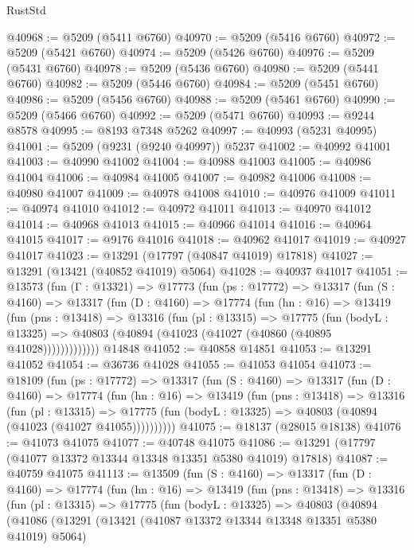 \begin{lexlean}{RustStd}
\begin{coremodule}
@40968 := @5209 (@5411 @6760)
@40970 := @5209 (@5416 @6760)
@40972 := @5209 (@5421 @6760)
@40974 := @5209 (@5426 @6760)
@40976 := @5209 (@5431 @6760)
@40978 := @5209 (@5436 @6760)
@40980 := @5209 (@5441 @6760)
@40982 := @5209 (@5446 @6760)
@40984 := @5209 (@5451 @6760)
@40986 := @5209 (@5456 @6760)
@40988 := @5209 (@5461 @6760)
@40990 := @5209 (@5466 @6760)
@40992 := @5209 (@5471 @6760)
@40993 := @9244 @8578
@40995 := @8193 @7348 @5262
@40997 := @40993 (@5231 @40995)
@41001 := @5209 (@9231 (@9240 @40997)) @5237
@41002 := @40992 @41001
@41003 := @40990 @41002
@41004 := @40988 @41003
@41005 := @40986 @41004
@41006 := @40984 @41005
@41007 := @40982 @41006
@41008 := @40980 @41007
@41009 := @40978 @41008
@41010 := @40976 @41009
@41011 := @40974 @41010
@41012 := @40972 @41011
@41013 := @40970 @41012
@41014 := @40968 @41013
@41015 := @40966 @41014
@41016 := @40964 @41015
@41017 := @9176 @41016
@41018 := @40962 @41017
@41019 := @40927 @41017
@41023 := @13291 (@17797 (@40847 @41019) @17818)
@41027 := @13291 (@13421 (@40852 @41019) @5064)
@41028 := @40937 @41017
@41051 := @13573
    (fun (Γ : @13321) =>
    @17773
      (fun (ps : @17772) =>
      @13317
        (fun (S : @4160) =>
        @13317
          (fun (D : @4160) =>
          @17774
            (fun (hn : @16) =>
            @13419
              (fun (pns : @13418) =>
              @13316
                (fun (pl : @13315) =>
                @17775
                  (fun (bodyL : @13325) =>
                  @40803 (@40894 (@41023 (@41027 (@40860 (@40895 @41028)))))))))))))
    @14848
@41052 := @40858 @14851
@41053 := @13291 @41052
@41054 := @36736 @41028
@41055 := @41053 @41054
@41073 := @18109
    (fun (ps : @17772) =>
    @13317
      (fun (S : @4160) =>
      @13317
        (fun (D : @4160) =>
        @17774
          (fun (hn : @16) =>
          @13419
            (fun (pns : @13418) =>
            @13316
              (fun (pl : @13315) =>
              @17775 (fun (bodyL : @13325) => @40803 (@40894 (@41023 (@41027 @41055))))))))))
@41075 := @18137 (@28015 @18138)
@41076 := @41073 @41075
@41077 := @40748 @41075
@41086 := @13291 (@17797 (@41077 @13372 @13344 @13348 @13351 @5380 @41019) @17818)
@41087 := @40759 @41075
@41113 := @13509
    (fun (S : @4160) =>
    @13317
      (fun (D : @4160) =>
      @17774
        (fun (hn : @16) =>
        @13419
          (fun (pns : @13418) =>
          @13316
            (fun (pl : @13315) =>
            @17775
              (fun (bodyL : @13325) =>
              @40803
                (@40894
                  (@41086
                    (@13291
                      (@13421 (@41087 @13372 @13344 @13348 @13351 @5380 @41019) @5064)

\end{coremodule}
\end{lexlean}
